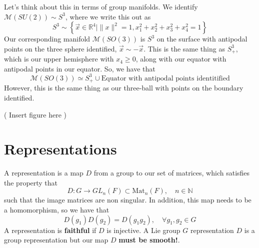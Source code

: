 \documentclass[11pt, oneside]{article}   	%
\theoremstyle{slanted}
\begin{document}
 Let's think about this in terms of group manifolds. 
 We identify $\mathcal{ M } ( SU ( 2) ) \sim S^ 3 $, where we write this out as 
 \[S^ 3 \sim \left\{  \vec{x} \in \mathbb{ R}  ^ 4 \mid  \| x \| ^ 2 = 1 , x_1^ 2 + x_2 ^ 2 + x_3 ^ 2 + x_4 ^ 2 = 1  \right\} 
\] Our corresponding manifold $ \mathcal{ M } ( SO ( 3) ) $ is $ S^ 3 $ on the surface 
with antipodal points on the three sphere identified, $ \vec{x} \sim  - \vec{x}$. 
This is the same thing as $ S^ 3 _ +  $, which is our upper hemisphere with $ x_4 \geq 0 $, 
along with our equator with antipodal points in our equator. So, we have that
\[
	\mathcal{ M } ( SO ( 3) ) \simeq S^3 _ + \cup \text{Equator with antipodal points identitified} 
\] 
 However, this is the same thing as our three-ball with points on
the boundary identified.

( Insert figure here ) 





\pagebreak 
\section{Representations}

A representation is a map $ D $ from a group 
to our set of matrices, which satisfies the property that 
\[
	D : G \to  GL_ n ( F ) \subset \text{Mat}_n (  F), \quad n \in \mathbb{ N }
\] such that the image matrices 
are non singular. In addition, this map 
needs to be a homomorphism, so we have that 
\[
	D( g_1 )  D( g_2) = D ( g_1 g_2 ) , \quad \forall g_1, g_2 \in G 
\] A representation is \textbf{faithful} if $ D $ is injective. 
A Lie group $G$ representation $ D $ is a group representation 
but our map $ D $ \textbf{must be smooth!}.
\end{document}
